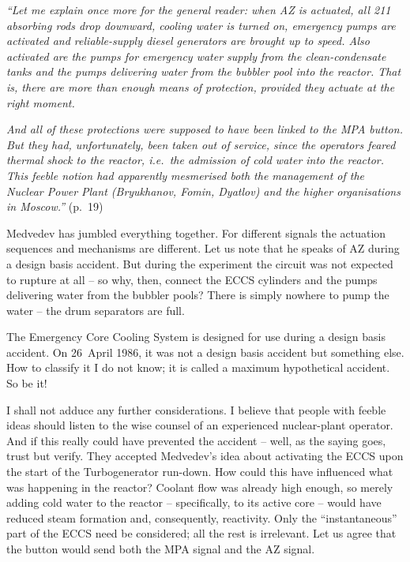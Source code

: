 \documentclass[openright]{bookest}
\begin{document}
\begin{personal}
\textit{``Let me explain once more for the general reader: when AZ is actuated, all \num{211} absorbing rods drop downward, cooling water is turned on, emergency pumps are activated and reliable-supply diesel generators are brought up to speed. Also activated are the pumps for emergency water supply from the clean-condensate tanks and the pumps delivering water from the bubbler pool into the reactor. That is, there are more than enough means of protection, provided they actuate at the right moment.}

\textit{And all of these protections were supposed to have been linked to the MPA button. But they had, unfortunately, been taken out of service, since the operators feared thermal shock to the reactor, i.e.\ the admission of cold water into the reactor. This feeble notion had apparently mesmerised both the management of the Nuclear Power Plant (Bryukhanov, Fomin, Dyatlov) and the higher organisations in Moscow.''} (p.~19)
\end{personal}

Medvedev has jumbled everything together. For different signals the actuation sequences and mechanisms are different. Let us note that he speaks of AZ during a design basis accident. But during the experiment the circuit was not expected to rupture at all -- so why, then, connect the ECCS cylinders and the pumps delivering water from the bubbler pools? There is simply nowhere to pump the water -- the drum separators are full.

The Emergency Core Cooling System is designed for use during a design basis accident. On 26~April 1986, it was not a design basis accident but something else. How to classify it I do not know; it is called a maximum hypothetical accident. So be it!

I shall not adduce any further considerations. I believe that people with feeble ideas should listen to the wise counsel of an experienced nuclear-plant operator. And if this really could have prevented the accident -- well, as the saying goes, trust but verify. They accepted Medvedev's idea about activating the ECCS upon the start of the Turbogenerator run-down. How could this have influenced what was happening in the reactor? Coolant flow was already high enough, so merely adding cold water to the reactor -- specifically, to its active core -- would have reduced steam formation and, consequently, reactivity. Only the ``instantaneous'' part of the ECCS need be considered; all the rest is irrelevant. Let us agree that the button would send both the MPA signal and the AZ signal.
\end{document}
